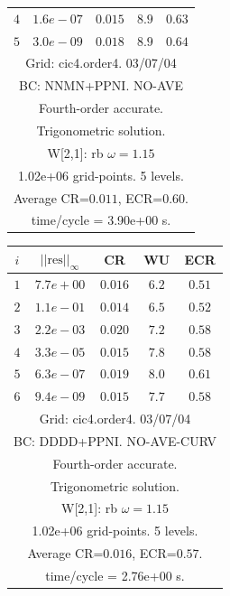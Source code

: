 \begin{table}[hbt]
\begin{center}
{\begin{tabular}{|c|c|c|c|c|}
 $ 4$  & $ 1.6e-07$ & $0.015$ & $ 8.9$ & $0.63$ \\ 
 $ 5$  & $ 3.0e-09$ & $0.018$ & $ 8.9$ & $0.64$ \\ 
\hline 
\multicolumn{5}{|c|}{Grid: cic4.order4. 03/07/04}  \\
\multicolumn{5}{|c|}{BC: NNMN+PPNI. NO-AVE}  \\
\multicolumn{5}{|c|}{Fourth-order accurate.}  \\
\multicolumn{5}{|c|}{Trigonometric solution.}  \\
\multicolumn{5}{|c|}{W[2,1]: rb $\omega=1.15$}  \\
\multicolumn{5}{|c|}{1.02e+06 grid-points. 5 levels.}  \\
\multicolumn{5}{|c|}{Average CR=$0.011$, ECR=$0.60$.}  \\
\multicolumn{5}{|c|}{time/cycle = 3.90e+00 s.}  \\
\hline 
\end{tabular}
\begin{tabular}{|c|c|c|c|c|} \hline 
 $i$   & $\vert\vert\mbox{res}\vert\vert_\infty$  &  CR     &  WU    & ECR  \\   \hline 
 $ 1$  & $ 7.7e+00$ & $0.016$ & $ 6.2$ & $0.51$ \\ 
 $ 2$  & $ 1.1e-01$ & $0.014$ & $ 6.5$ & $0.52$ \\ 
 $ 3$  & $ 2.2e-03$ & $0.020$ & $ 7.2$ & $0.58$ \\ 
 $ 4$  & $ 3.3e-05$ & $0.015$ & $ 7.8$ & $0.58$ \\ 
 $ 5$  & $ 6.3e-07$ & $0.019$ & $ 8.0$ & $0.61$ \\ 
 $ 6$  & $ 9.4e-09$ & $0.015$ & $ 7.7$ & $0.58$ \\ 
\hline 
\multicolumn{5}{|c|}{Grid: cic4.order4. 03/07/04}  \\
\multicolumn{5}{|c|}{BC: DDDD+PPNI. NO-AVE-CURV}  \\
\multicolumn{5}{|c|}{Fourth-order accurate.}  \\
\multicolumn{5}{|c|}{Trigonometric solution.}  \\
\multicolumn{5}{|c|}{W[2,1]: rb $\omega=1.15$}  \\
\multicolumn{5}{|c|}{1.02e+06 grid-points. 5 levels.}  \\
\multicolumn{5}{|c|}{Average CR=$0.016$, ECR=$0.57$.}  \\
\multicolumn{5}{|c|}{time/cycle = 2.76e+00 s.}  \\
\hline 
\end{tabular}
\begin{tabular}{|c|c|c|c|c|} \hline 

\end{tabular}}
\end{center}
\end{table}
